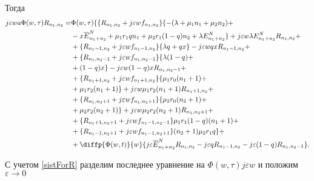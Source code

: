 Тогда
 \begin{equation*}
	\begin{split}
		j\varepsilon wa \Phi (w,\tau)R_{n_{1}, n_{2}}=
		&\Phi (w,\tau)\{\{R_{n_{1}, n_{2}}+j\varepsilon w f_{n_{1}, n_{2}}\}\{-(\lambda+\mu_{1}n_{1}+\mu_{2}n_{2}) +\\
		&-x\overline{E}_{n_{1}+n_{2}}^N+\mu_{1}r_{1}q n_{1}+ \mu_{2}r_{1}(1-q)n_{2}+ \lambda E_{n_{1}+n_{2}}^N\} +j\varepsilon w \lambda E_{n_{1}+n_{2}}^NR_{n_{1}, n_{2}} +\\
		&+\{R_{n_{1}-1, n_{2}}+j\varepsilon w f_{n_{1}-1, n_{2}}\}\{\lambda q+ q  x\}-j\varepsilon wq xR_{n_{1}-1, n_{2}}+\\
		&+\{R_{n_{1}, n_{2}-1}+j\varepsilon w f_{n_{1}, n_{2}-1}\}\{\lambda (1-q) +\\
		&+ (1-q) x\} -j\varepsilon w(1-q) xR_{n_{1}, n_{2}-1} +\\
		&+ \{R_{n_{1}+1, n_{2}}+j\varepsilon w f_{n_{1}+1, n_{2}}\}\{\mu_{1} r_{0}(n_{1}+1)+\\
		& + \mu_{1} r_{2}(n_{1}+1)\}+j\varepsilon w\mu_{1} r_{2}(n_{1}+1)R_{n_{1}+1, n_{2}}+\\
		&+ \{R_{n_{1}, n_{2}+1}+j\varepsilon w f_{n_{1}, n_{2}+1}\}\{\mu_{2} r_{0}(n_{2}+1)+\\
		& + \mu_{2} r_{2} (n_{2}+1)\} +j\varepsilon w\mu_{2} r_{2} (n_{2}+1)R_{n_{1}, n_{2}+1}+\\
		&+\{R_{n_{1}+1, n_{2}+1}+j\varepsilon w f_{n_{1}-1, n_{2}-1}\}\mu_{1} r_{1}(1-q)(n_{1}+1) +\\
		&+\{R_{n_{1}-1, n_{2}+1}+j\varepsilon w f_{n_{1}-1, n_{2}+1}\}(n_{2}+1)\mu_{2} r_{1}q\}  +\\
		&+ \diffp{\Phi(w,t)}{w}\{j\varepsilon \overline{E}_{n_{1}+n_{2}}^NR_{n_{1}, n_{2}}-  j\varepsilon q R_{n_{1}-1, n_{2}}-j \varepsilon (1-q) R_{n_{1}, n_{2}-1}\}.
	\end{split}
\end{equation*}

С учетом \eqref{sistForR} разделим последнее уравнение на $\Phi (w, \tau)j\varepsilon w$ и положим $\varepsilon \rightarrow 0$

